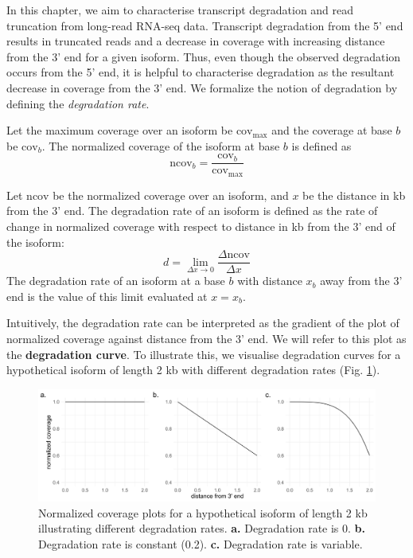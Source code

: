 
In this chapter, we aim to characterise transcript degradation and read truncation from long-read RNA-seq data. Transcript degradation from the 5' end results in truncated reads and a decrease in coverage with increasing distance from the 3' end for a given isoform. Thus, even though the observed degradation occurs from the 5' end, it is helpful to characterise degradation as the resultant decrease in coverage from the 3' end. We formalize the notion of degradation by defining the \textit{degradation rate}. 
\begin{definition}
Let the maximum coverage over an isoform be $\mathrm{cov}_{\mathrm{max}}$ and the coverage at base $b$ be $\mathrm{cov}_b$. The normalized coverage of the isoform at base $b$ is defined as 
\begin{equation}
    \mathrm{ncov}_b=\frac{\mathrm{cov}_b}{\mathrm{cov}_{\mathrm{max}}}
\end{equation}
\end{definition}
\begin{definition}
Let $\mathrm{ncov}$ be the normalized coverage over an isoform, and $x$ be the distance in kb from the 3' end. The degradation rate of an isoform is defined as the rate of change in normalized coverage with respect to distance in kb from the 3' end of the isoform:
\begin{equation}
    d=\lim_{\Delta x\rightarrow 0} \frac{\Delta \mathrm{ncov}}{\Delta x}
\end{equation}
The degradation rate of an isoform at a base $b$ with distance $x_b$ away from the 3' end is the value of this limit evaluated at $x=x_b$. 
\end{definition}
Intuitively, the degradation rate can be interpreted as the gradient of the plot of normalized coverage against distance from the 3' end. We will refer to this plot as the \textbf{degradation curve}. To illustrate this, we visualise degradation curves for a hypothetical isoform of length 2 kb with different degradation rates (Fig. \ref{fig:sec-2-hypo}).  
\begin{figure}[H]
    \centering
    \includegraphics[width=\textwidth]{figures/sec-2-hypo.png}
    \caption[Normalized coverage plots for a hypothetical isoform]{Normalized coverage plots for a hypothetical isoform of length 2 kb illustrating different degradation rates. \textbf{a.} Degradation rate is 0. \textbf{b.} Degradation rate is constant (0.2). \textbf{c.} Degradation rate is variable.}
    \label{fig:sec-2-hypo}
\end{figure}
